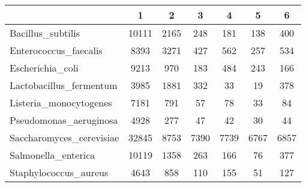 \begin{tabular}{|l||c|c|c|c|c|c|}
\hline
& 1 & 2 & 3 & 4 & 5 & 6 \\
\hline
\hline
Bacillus\_subtilis & \cellcolor[RGB]{235, 71, 71} 10111 & \cellcolor[RGB]{235, 71, 71} 2165 & \cellcolor[RGB]{241, 241, 253} 248 & \cellcolor[RGB]{227, 227, 252} 181 & \cellcolor[RGB]{218, 218, 251} 138 & \cellcolor[RGB]{253, 237, 237} 400 \\
\hline
Enterococcus\_faecalis & \cellcolor[RGB]{235, 71, 71} 8393 & \cellcolor[RGB]{235, 71, 71} 3271 & \cellcolor[RGB]{223, 223, 251} 427 & \cellcolor[RGB]{254, 250, 250} 562 & \cellcolor[RGB]{172, 172, 246} 257 & \cellcolor[RGB]{250, 250, 254} 534 \\
\hline
Escherichia\_coli & \cellcolor[RGB]{235, 71, 71} 9213 & \cellcolor[RGB]{235, 71, 71} 970 & \cellcolor[RGB]{227, 227, 252} 183 & \cellcolor[RGB]{253, 237, 237} 484 & \cellcolor[RGB]{237, 237, 253} 243 & \cellcolor[RGB]{227, 227, 252} 166 \\
\hline
Lactobacillus\_fermentum & \cellcolor[RGB]{235, 71, 71} 3985 & \cellcolor[RGB]{235, 71, 71} 1881 & \cellcolor[RGB]{250, 250, 254} 332 & \cellcolor[RGB]{218, 218, 251} 33 & \cellcolor[RGB]{218, 218, 251} 19 & \cellcolor[RGB]{254, 250, 250} 378 \\
\hline
Listeria\_monocytogenes & \cellcolor[RGB]{235, 71, 71} 7181 & \cellcolor[RGB]{235, 71, 71} 791 & \cellcolor[RGB]{223, 223, 251} 57 & \cellcolor[RGB]{250, 250, 254} 78 & \cellcolor[RGB]{186, 186, 247} 33 & \cellcolor[RGB]{254, 250, 250} 84 \\
\hline
Pseudomonas\_aeruginosa & \cellcolor[RGB]{235, 71, 71} 4928 & \cellcolor[RGB]{235, 71, 71} 277 & \cellcolor[RGB]{253, 241, 241} 47 & \cellcolor[RGB]{227, 227, 252} 42 & \cellcolor[RGB]{94, 94, 237} 30 & \cellcolor[RGB]{241, 241, 253} 44 \\
\hline
Saccharomyces\_cerevisiae & \cellcolor[RGB]{235, 71, 71} 32845 & \cellcolor[RGB]{247, 182, 182} 8753 & \cellcolor[RGB]{246, 246, 254} 7390 & \cellcolor[RGB]{254, 246, 246} 7739 & \cellcolor[RGB]{218, 218, 251} 6767 & \cellcolor[RGB]{223, 223, 251} 6857 \\
\hline
Salmonella\_enterica & \cellcolor[RGB]{235, 71, 71} 10119 & \cellcolor[RGB]{235, 71, 71} 1358 & \cellcolor[RGB]{246, 246, 254} 263 & \cellcolor[RGB]{223, 223, 251} 166 & \cellcolor[RGB]{209, 209, 250} 76 & \cellcolor[RGB]{253, 241, 241} 377 \\
\hline
Staphylococcus\_aureus & \cellcolor[RGB]{235, 71, 71} 4643 & \cellcolor[RGB]{235, 71, 71} 858 & \cellcolor[RGB]{227, 227, 252} 110 & \cellcolor[RGB]{253, 241, 241} 155 & \cellcolor[RGB]{172, 172, 246} 51 & \cellcolor[RGB]{241, 241, 253} 127 \\
\hline
\end{tabular}
